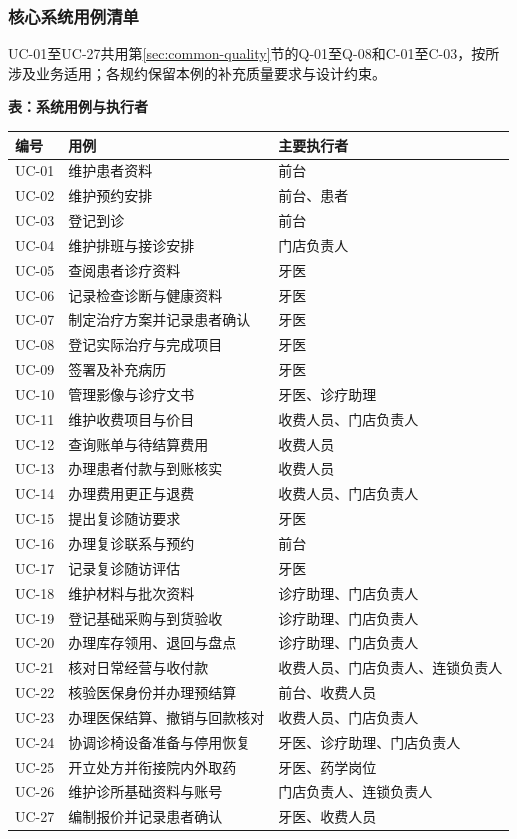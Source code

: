 \documentclass[UTF8,a4paper,zihao=-4,fontset=none]{ctexart}
\begin{document}
\subsubsection{核心系统用例清单}
UC-01至UC-27共用第\ref{sec:common-quality}节的Q-01至Q-08和C-01至C-03，按所涉及业务适用；各规约保留本例的补充质量要求与设计约束。\par
{\small\setlength{\tabcolsep}{3pt}\renewcommand{\arraystretch}{1.03}
\noindent\textbf{表\thetable：系统用例与执行者}\par\smallskip
\noindent\begin{tabular}{@{}>{\raggedright\arraybackslash}p{1.472cm}>{\raggedright\arraybackslash}p{8.341cm}>{\raggedright\arraybackslash}p{5.887cm}@{}}
\toprule
编号 & 用例 & 主要执行者 \\ \midrule
UC-01 & 维护患者资料 & 前台 \\
UC-02 & 维护预约安排 & 前台、患者 \\
UC-03 & 登记到诊 & 前台 \\
UC-04 & 维护排班与接诊安排 & 门店负责人 \\
UC-05 & 查阅患者诊疗资料 & 牙医 \\
UC-06 & 记录检查诊断与健康资料 & 牙医 \\
UC-07 & 制定治疗方案并记录患者确认 & 牙医 \\
UC-08 & 登记实际治疗与完成项目 & 牙医 \\
UC-09 & 签署及补充病历 & 牙医 \\
UC-10 & 管理影像与诊疗文书 & 牙医、诊疗助理 \\
UC-11 & 维护收费项目与价目 & 收费人员、门店负责人 \\
UC-12 & 查询账单与待结算费用 & 收费人员 \\
UC-13 & 办理患者付款与到账核实 & 收费人员 \\
UC-14 & 办理费用更正与退费 & 收费人员、门店负责人 \\
UC-15 & 提出复诊随访要求 & 牙医 \\
UC-16 & 办理复诊联系与预约 & 前台 \\
UC-17 & 记录复诊随访评估 & 牙医 \\
UC-18 & 维护材料与批次资料 & 诊疗助理、门店负责人 \\
UC-19 & 登记基础采购与到货验收 & 诊疗助理、门店负责人 \\
UC-20 & 办理库存领用、退回与盘点 & 诊疗助理、门店负责人 \\
UC-21 & 核对日常经营与收付款 & 收费人员、门店负责人、连锁负责人 \\
UC-22 & 核验医保身份并办理预结算 & 前台、收费人员 \\
UC-23 & 办理医保结算、撤销与回款核对 & 收费人员、门店负责人 \\
UC-24 & 协调诊椅设备准备与停用恢复 & 牙医、诊疗助理、门店负责人 \\
UC-25 & 开立处方并衔接院内外取药 & 牙医、药学岗位 \\
UC-26 & 维护诊所基础资料与账号 & 门店负责人、连锁负责人 \\
UC-27 & 编制报价并记录患者确认 & 牙医、收费人员 \\
\bottomrule
\end{tabular}\par}
\medskip
\end{document}
